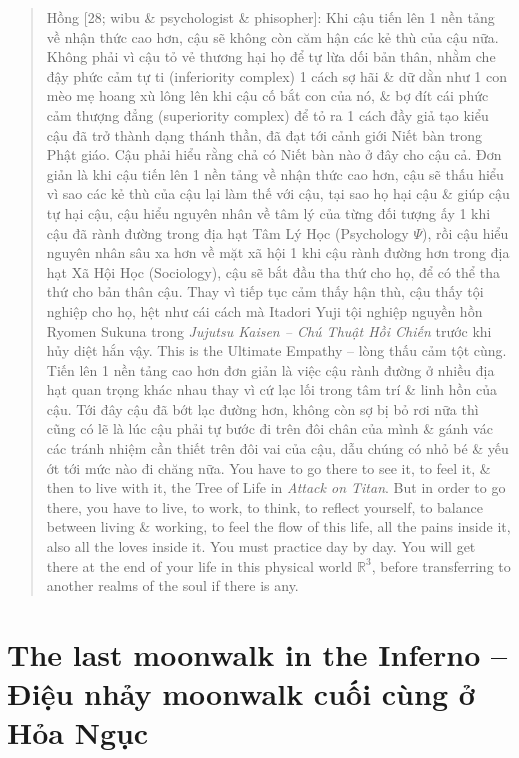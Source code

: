 \documentclass[12pt,twoside]{book}
\begin{document}
\begin{quote}
	{\sf Hồng [28; wibu \& psychologist \& phisopher]}: Khi cậu tiến lên 1 nền tảng về nhận thức cao hơn, cậu sẽ không còn căm hận các kẻ thù của cậu nữa. Không phải vì cậu tỏ vẻ thương hại họ để tự lừa dối bản thân, nhằm che đậy phức cảm tự ti (inferiority complex) 1 cách sợ hãi \& dữ dằn như 1 con mèo mẹ hoang xù lông lên khi cậu cố bắt con của nó, \& bợ đít cái phức cảm thượng đẳng (superiority complex) để tỏ ra 1 cách đầy giả tạo kiểu cậu đã trở thành dạng thánh thần, đã đạt tới cảnh giới Niết bàn trong Phật giáo. Cậu phải hiểu rằng chả có Niết bàn nào ở đây cho cậu cả. Đơn giản là khi cậu tiến lên 1 nền tảng về nhận thức cao hơn, cậu sẽ thấu hiểu vì sao các kẻ thù của cậu lại làm thế với cậu, tại sao họ hại cậu \& giúp cậu tự hại cậu, cậu hiểu nguyên nhân về tâm lý của từng đối tượng ấy 1 khi cậu đã rành đường trong địa hạt Tâm Lý Học (Psychology $\Psi$), rồi cậu hiểu nguyên nhân sâu xa hơn về mặt xã hội 1 khi cậu rành đường hơn trong địa hạt Xã Hội Học (Sociology), cậu sẽ bắt đầu tha thứ cho họ, để có thể tha thứ cho bản thân cậu. Thay vì tiếp tục cảm thấy hận thù, cậu thấy tội nghiệp cho họ, hệt như cái cách mà {\sf Itadori Yuji} tội nghiệp nguyền hồn {\sf Ryomen Sukuna} trong {\it Jujutsu Kaisen -- Chú Thuật Hồi Chiến} trước khi hủy diệt hắn vậy. This is the Ultimate Empathy -- lòng thấu cảm tột cùng. Tiến lên 1 nền tảng cao hơn đơn giản là việc cậu rành đường ở nhiều địa hạt quan trọng khác nhau thay vì cứ lạc lối trong tâm trí \& linh hồn của cậu. Tới đây cậu đã bớt lạc đường hơn, không còn sợ bị bỏ rơi nữa thì cũng có lẽ là lúc cậu phải tự bước đi trên đôi chân của mình \& gánh vác các tránh nhiệm cần thiết trên đôi vai của cậu, dẫu chúng có nhỏ bé \& yếu ớt tới mức nào đi chăng nữa. You have to go there to see it, to feel it, \& then to live with it, the Tree of Life in {\it Attack on Titan}. But in order to go there, you have to live, to work, to think, to reflect yourself, to balance between living \& working, to feel the flow of this life, all the pains inside it, also all the loves inside it. You must practice day by day. You will get there at the end of your life in this physical world $\mathbb{R}^3$, before transferring to another realms of the soul if there is any.
\end{quote}

\section{The last moonwalk in the Inferno -- Điệu nhảy moonwalk cuối cùng ở Hỏa Ngục}
\end{document}
